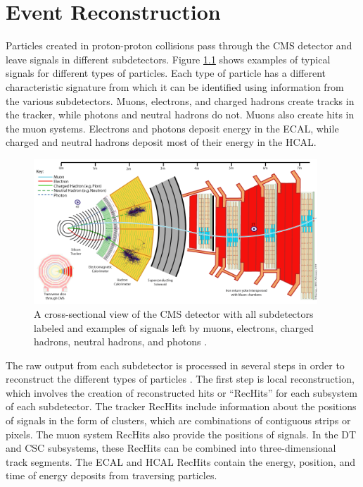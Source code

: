 \documentclass[12pt]{thesis}  %
\begin{document}
\chapter{Event Reconstruction
\label{ch:reconstruction}}

Particles created in proton-proton collisions pass through the CMS detector and leave signals in different subdetectors. Figure \ref{fig:cms-slice} shows examples of typical signals for different types of particles. Each type of particle has a different characteristic signature from which it can be identified using information from the various subdetectors. Muons, electrons, and charged hadrons create tracks in the tracker, while photons and neutral hadrons do not. Muons also create hits in the muon systems. Electrons and photons deposit energy in the ECAL, while charged and neutral hadrons deposit most of their energy in the HCAL.

\begin{figure}[hbt]
\begin{center}
\includegraphics[width=0.95\textwidth]{figures/CMS_slice.png}
\caption{A cross-sectional view of the CMS detector with all subdetectors labeled and examples of signals left by muons, electrons, charged hadrons, neutral hadrons, and photons \cite{CMS-slice}.}
\label{fig:cms-slice}
\end{center}
\end{figure}

The raw output from each subdetector is processed in several steps in order to reconstruct the different types of particles \cite{TDR-software}. The first step is local reconstruction, which involves the creation of reconstructed hits or ``RecHits'' for each subsystem of each subdetector. The tracker RecHits include information about the positions of signals in the form of clusters, which are combinations of contiguous strips or pixels. The muon system RecHits also provide the positions of signals. In the DT and CSC subsystems, these RecHits can be combined into three-dimensional track segments. The ECAL and HCAL RecHits contain the energy, position, and time of energy deposits from traversing particles.
\end{document}
